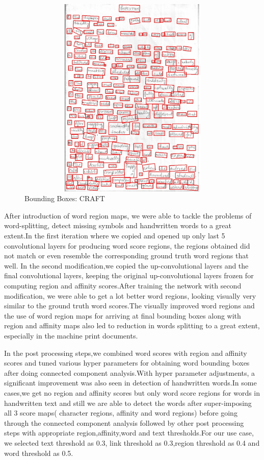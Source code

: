 \begin{figure}[H]
	\includegraphics[width=475pt,height=275pt]{craft_out.jpg}
	\caption{Bounding Boxes: CRAFT}
\end{figure}

After introduction of word region maps, we were able to tackle the problems of word-splitting, detect missing symbols and handwritten words to a great extent.In the first iteration where we copied and opened up only last 5 convolutional layers for producing word score regions, the regions obtained did not match or even resemble the corresponding ground truth word regions that well. In the second modification,we copied the up-convolutional layers and the final convolutional layers, keeping the original up-convolutional layers frozen for computing region and affinity scores.After training the network with second modification, we were able to get a lot better word regions, looking visually very similar to the ground truth word scores.The visually improved word regions and the use of word region maps for arriving at final bounding boxes along with region and affinity maps also led to reduction in words splitting to a great extent, especially in the machine print documents.

In the post processing steps,we combined word scores with region and affinity scores and tuned various hyper parameters for obtaining word bounding boxes after doing connected component analysis.With hyper parameter adjustments, a significant improvement was also seen in detection of handwritten words.In some cases,we get no region and affinity scores but only word score regions for words in handwritten text and still we are able to detect the words after super-imposing all 3 score maps( character regions, affinity and word regions) before going through the connected component analysis followed by other post processing steps with appropriate region,affinity,word and text thresholds.For our use case, we selected text threshold as 0.3, link threshold as 0.3,region threshold as 0.4 and word threshold as 0.5.

